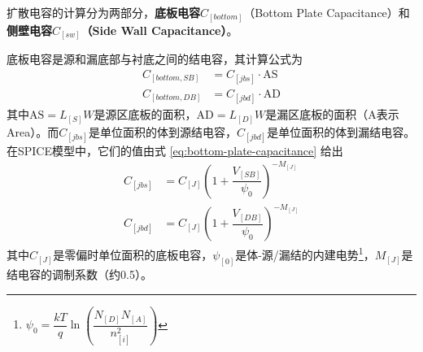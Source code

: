 扩散电容的计算分为两部分，\textbf{底板电容$C_[bottom]$}（Bottom Plate Capacitance）和\textbf{侧壁电容$C_[sw]$（Side Wall Capacitance）}。

底板电容是源和漏底部与衬底之间的结电容，其计算公式为
\begin{equation}
    \begin{aligned}
        C_[bottom,SB] &= C_[jbs]\cdot\mathrm{AS} \\
        C_[bottom,DB] &= C_[jbd]\cdot\mathrm{AD}
    \end{aligned}
\end{equation}
其中$\mathrm{AS} = L_[S]W$是源区底板的面积，$\mathrm{AD} = L_[D]W$是漏区底板的面积（A表示Area）。而$C_[jbs]$是单位面积的体到源结电容，$C_[jbd]$是单位面积的体到漏结电容。
在SPICE模型中，它们的值由式 \ref{eq:bottom-plate-capacitance} 给出
\begin{equation}
    \begin{aligned}
        C_[jbs] &= C_[J] \left(1 + \dfrac{V_[SB]}{\psi_0}\right)^{-M_[J]} \\
        C_[jbd] &= C_[J] \left(1 + \dfrac{V_[DB]}{\psi_0}\right)^{-M_[J]}
    \end{aligned}
    \label{eq:bottom-plate-capacitance}
\end{equation}
其中$C_[J]$是零偏时单位面积的底板电容，$\psi_[0]$是体-源/漏结的内建电势\footnote{$\psi_{0} = \dfrac{kT}{q}\ln\left(\dfrac{N_[D]N_[A]}{n_[i]^2}\right)$}，$M_[J]$是结电容的调制系数（约0.5）。

